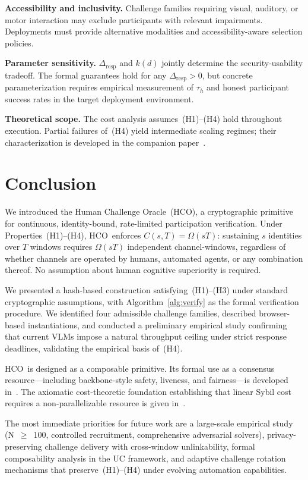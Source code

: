 \documentclass[11pt]{article}
\newcommand{\HCO}{HCO\xspace}
\theoremstyle{remark}
\theoremstyle{plain}
\begin{document}
	\noindent\textbf{Accessibility and inclusivity.}
	Challenge families requiring visual, auditory, or motor interaction may
	exclude participants with relevant impairments. Deployments must provide
	alternative modalities and accessibility-aware selection policies.
	
	\noindent\textbf{Parameter sensitivity.}
	$\Delta_{\mathrm{resp}}$ and $k(d)$ jointly determine the security-usability
	tradeoff. The formal guarantees hold for any $\Delta_{\mathrm{resp}} > 0$,
	but concrete parameterization requires empirical measurement of $\tau_h$
	and honest participant success rates in the target deployment environment.
	
	\noindent\textbf{Theoretical scope.}
	The cost analysis assumes~(H1)--(H4) hold throughout execution. Partial
	failures of~(H4) yield intermediate scaling regimes; their characterization
	is developed in the companion paper~\cite{maleki2026geometry}.
	
	
	\section{Conclusion}
	\label{sec:conclusion}
	
	We introduced the Human Challenge Oracle~(\HCO), a cryptographic
	primitive for continuous, identity-bound, rate-limited participation
	verification. Under Properties~(H1)--(H4), \HCO\ enforces
	$C(s,T) = \Omega(sT)$: sustaining $s$ identities over $T$ windows
	requires $\Omega(sT)$ independent channel-windows, regardless of
	whether channels are operated by humans, automated agents, or any
	combination thereof. No assumption about human cognitive superiority
	is required.
	
	We presented a hash-based construction satisfying~(H1)--(H3) under
	standard cryptographic assumptions, with Algorithm~\ref{alg:verify}
	as the formal verification procedure. We identified four admissible
	challenge families, described browser-based instantiations, and
	conducted a preliminary empirical study confirming that current VLMs
	impose a natural throughput ceiling under strict response deadlines,
	validating the empirical basis of~(H4).
	
	\HCO\ is designed as a composable primitive. Its formal use as a
	consensus resource---including backbone-style safety, liveness, and
	fairness---is developed in~\cite{maleki2026pocmt}. The axiomatic
	cost-theoretic foundation establishing that linear Sybil cost requires
	a non-parallelizable resource is given in~\cite{maleki2026geometry}.
	
	The most immediate priorities for future work are a large-scale empirical
	study (N~$\geq$~100, controlled recruitment, comprehensive adversarial
	solvers), privacy-preserving challenge delivery with cross-window
	unlinkability, formal composability analysis in the UC framework, and
	adaptive challenge rotation mechanisms that preserve~(H1)--(H4) under
	evolving automation capabilities.
	
	
	
	
	
	
\end{document}

